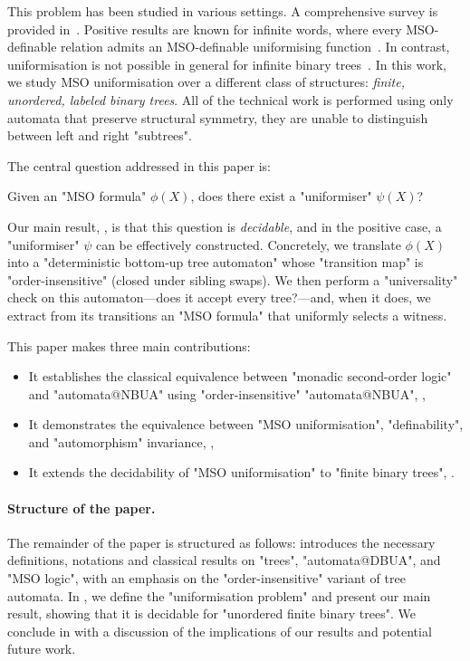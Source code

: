 \documentclass[a4paper,UKenglish,cleveref, autoref, thm-restate]{lipics-v2021}
\begin{document}
This problem has been studied in various settings. A comprehensive survey is provided in~\cite{Cara15}. Positive results are known for infinite words, where every MSO-definable
relation admits an MSO-definable uniformising function~\cite{Siefkes1975, Choffrut1999, Rabin07}. In contrast, uniformisation is not possible in general for infinite binary
trees~\cite{GS83}.
In this work, we study MSO uniformisation over a different class of structures: \emph{finite, unordered, labeled binary trees}.
All of the technical work is performed using only automata that preserve structural symmetry,
\ie they are unable to distinguish between left and right "subtrees".

The central question addressed in this paper is:

\begin{problem}\label{prob:uniformisation-problem}
\AP Given an "MSO formula" $\phi(X)$, does there exist a "uniformiser" $\psi(X)$?
\end{problem}

Our main result, , is that this question is \emph{decidable}, and in the positive case, a "uniformiser" $\psi$ can be effectively constructed. Concretely, we translate $\phi(X)$ into a
"deterministic bottom-up tree automaton" whose "transition map" is "order-insensitive" (\ie closed under sibling swaps). We then perform a "universality" check on this
automaton—does it accept every tree?—and, when it does, we extract from its transitions an "MSO formula" that uniformly selects a witness.

This paper makes three main contributions:
\begin{itemize}
	\item It establishes the classical equivalence between "monadic second-order logic" and "automata@NBUA" using "order-insensitive" "automata@NBUA", ,
	\item It demonstrates the equivalence between "MSO uniformisation", "definability", and "automorphism" invariance, ,
	\item It extends the decidability of "MSO uniformisation" to "finite binary trees", .
\end{itemize}


\paragraph*{Structure of the paper.} The remainder of the paper is structured as follows:
 introduces the necessary definitions, notations and classical results on "trees", "automata@DBUA", and "MSO logic", with an emphasis on the "order-insensitive"
variant of tree automata.
In , we define the "uniformisation problem" and present our main result, showing that it is decidable for "unordered finite binary trees".
We conclude in  with a discussion of the implications of our results and potential future work.
\end{document}
